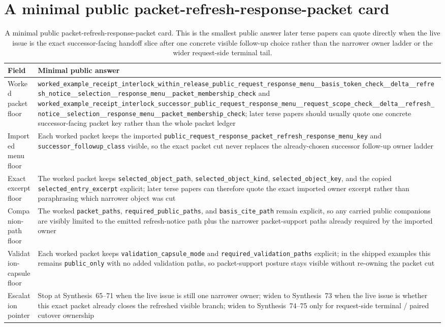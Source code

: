 \documentclass[11pt]{article}
\begin{document}
\section{A minimal public packet-refresh-response-packet card}
\begin{table}[t]
\centering
\small
\begin{tabularx}{\linewidth}{@{}LY@{}}
\toprule
Field & Minimal public answer \\
\midrule
Worked packet floor & \nolinkurl{worked_example_receipt_interlock_within_release_public_request_response_menu__basis_token_check__delta__refresh_notice__selection__response_menu__packet_membership_check} and \nolinkurl{worked_example_receipt_interlock_successor_public_request_response_menu__request_scope_check__delta__refresh_notice__selection__response_menu__packet_membership_check}; later terse papers should usually quote one concrete successor-facing packet key rather than the whole packet ledger \\
Imported menu floor & Each worked packet keeps the imported \nolinkurl{public_request_response_packet_refresh_response_menu_key} and \nolinkurl{successor_followup_class} visible, so the exact packet cut never replaces the already-chosen successor follow-up owner ladder \\
Exact excerpt floor & The worked packet keeps \nolinkurl{selected_object_path}, \nolinkurl{selected_object_kind}, \nolinkurl{selected_object_key}, and the copied \nolinkurl{selected_entry_excerpt} explicit; later terse papers can therefore quote the exact imported owner excerpt rather than paraphrasing which narrower object was cut \\
Companion-path floor & The worked \nolinkurl{packet_paths}, \nolinkurl{required_public_paths}, and \nolinkurl{basis_cite_path} remain explicit, so any carried public companions are visibly limited to the emitted refresh-notice path plus the narrower packet-support paths already required by the imported owner \\
Validation-capsule floor & Each worked packet keeps \nolinkurl{validation_capsule_mode} and \nolinkurl{required_validation_paths} explicit; in the shipped examples this remains \nolinkurl{public_only} with no added validation paths, so packet-support posture stays visible without re-owning the packet cut \\
Escalation pointer & Stop at Synthesis~65--71 when the live issue is still one narrower owner; widen to Synthesis~73 when the live issue is whether this exact packet already closes the refreshed visible branch; widen to Synthesis~74--75 only for request-side terminal / paired cutover ownership \\
\bottomrule
\end{tabularx}
\caption{A minimal public packet-refresh-response-packet card. This is the smallest public answer later terse papers can quote directly when the live issue is the exact successor-facing handoff slice after one concrete visible follow-up choice rather than the narrower owner ladder or the wider request-side terminal tail.}
\label{tab:minimal-public-packet-refresh-response-packet-card}
\end{table}
\end{document}
